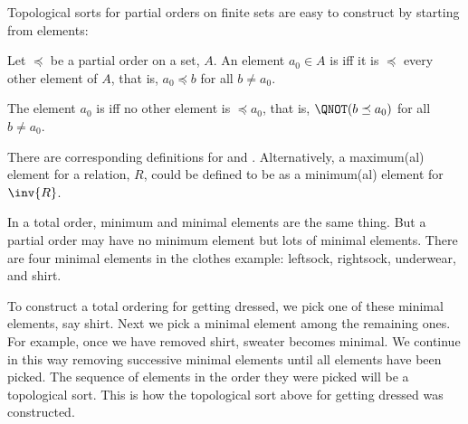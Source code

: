 Topological sorts for partial orders on finite sets are easy to construct
by starting from  elements:

\begin{definition}
  Let $\preceq$ be a partial order on a set, $A$.  An element $a_0 \in A$
  is  iff it is $\preceq$ every
  other element of $A$, that is, $a_0 \preceq b$ for all $b \neq a_0$.

  The element $a_0$ is  iff no
  other element is $\preceq a_0$, that is, $\QNOT(b \preceq a_0)$ for all
  $b \neq a_0$.
\end{definition}
There are corresponding definitions for  and .
Alternatively, a maximum(al) element for a relation, $R$, could be
defined to be as a minimum(al) element for $\inv{R}$.

In a total order, minimum and minimal elements are the same thing.  But a
partial order may have no minimum element but lots of minimal elements.
There are four minimal elements in the clothes example: leftsock,
rightsock, underwear, and shirt.

To construct a total ordering for getting dressed, we pick one of these
minimal elements, say shirt.  Next we pick a minimal element among the
remaining ones.  For example, once we have removed shirt, sweater becomes
minimal.  We continue in this way removing successive minimal elements
until all elements have been picked.  The sequence of elements in the
order they were picked will be a topological sort.  This is how the
topological sort above for getting dressed was constructed.


